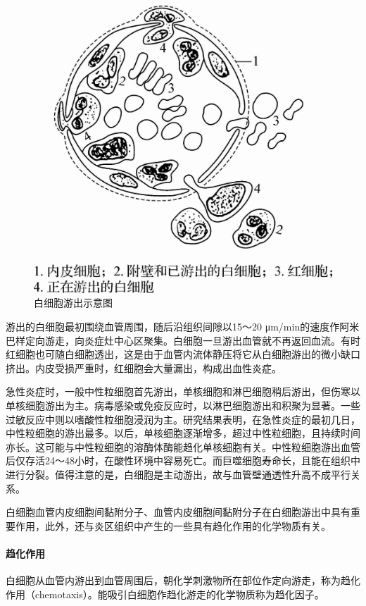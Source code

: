 \begin{figure}[!htbp]
  \centering
  \includegraphics[scale=1.2]{./images/Image00052.jpg}
  \caption{白细胞游出示意图}
  \label{fig4-2}
\end{figure}

游出的白细胞最初围绕血管周围，随后沿组织间隙以15～20
μm/min的速度作阿米巴样定向游走，向炎症灶中心区聚集。白细胞一旦游出血管就不再返回血流。有时红细胞也可随白细胞透出，这是由于血管内流体静压将它从白细胞游出的微小缺口挤出。内皮受损严重时，红细胞会大量漏出，构成出血性炎症。

急性炎症时，一般中性粒细胞首先游出，单核细胞和淋巴细胞稍后游出，但伤寒以单核细胞游出为主。病毒感染或免疫反应时，以淋巴细胞游出和积聚为显著。一些过敏反应中则以嗜酸性粒细胞浸润为主。研究结果表明，在急性炎症的最初几日，中性粒细胞的游出最多。以后，单核细胞逐渐增多，超过中性粒细胞，且持续时间亦长。这可能与中性粒细胞的溶酶体酶能趋化单核细胞有关。中性粒细胞游出血管后仅存活24～48小时，在酸性环境中容易死亡。而巨噬细胞寿命长，且能在组织中进行分裂。值得注意的是，白细胞是主动游出，故与血管壁通透性升高不成平行关系。

白细胞血管内皮细胞间黏附分子、血管内皮细胞间黏附分子在白细胞游出中具有重要作用，此外，还与炎区组织中产生的一些具有趋化作用的化学物质有关。

\paragraph{趋化作用}
白细胞从血管内游出到血管周围后，朝化学刺激物所在部位作定向游走，称为趋化作用（chemotaxis）。能吸引白细胞作趋化游走的化学物质称为趋化因子。

